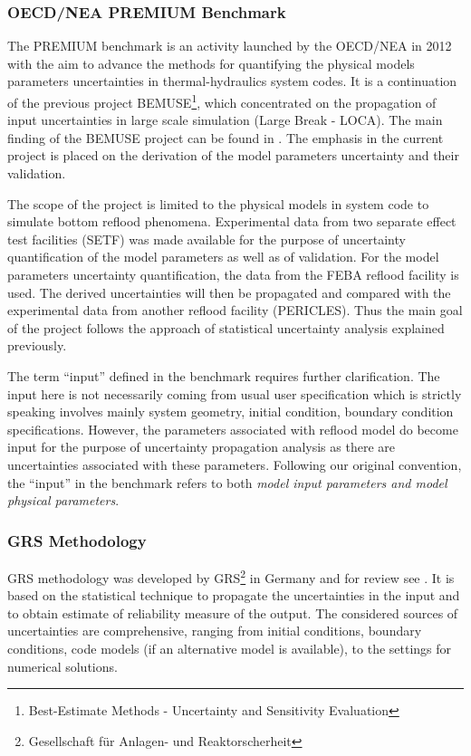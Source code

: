 \documentclass[11pt,titlepage]{article}
\begin{document}
\subsubsection{OECD/NEA PREMIUM Benchmark}

The PREMIUM benchmark is an activity launched by the OECD/NEA in 2012 with the aim to advance the methods for quantifying the physical models parameters uncertainties in thermal-hydraulics system codes.
It is a continuation of the previous project BEMUSE\footnote{Best-Estimate Methods - Uncertainty and Sensitivity Evaluation}, which concentrated on the propagation of input uncertainties in large scale simulation (Large Break - LOCA).
The main finding of the BEMUSE project can be found in \cite{Perezetal2011}.
The emphasis in the current project is placed on the derivation of the model parameters uncertainty and their validation.

The scope of the project is limited to the physical models in system code to simulate bottom reflood phenomena.
Experimental data from two separate effect test facilities (SETF) was made available for the purpose of uncertainty quantification of the model parameters as well as of validation.
For the model parameters uncertainty quantification, the data from the FEBA reflood facility \cite{IhleRust1984} is used.
The derived uncertainties will then be propagated and compared with the experimental data from another reflood facility (PERICLES).
Thus the main goal of the project follows the approach of statistical uncertainty analysis explained previously.

The term ``input'' defined in the benchmark requires further clarification. 
The input here is not necessarily coming from usual user specification which is strictly speaking involves mainly system geometry, initial condition, boundary condition specifications. 
However, the parameters associated with reflood model do become input for the purpose of uncertainty propagation analysis as there are uncertainties associated with these parameters. 
Following our original convention, the ``input'' in the benchmark refers to both \emph{model input parameters and model physical parameters}.

\subsubsection{GRS Methodology}

GRS methodology was developed by GRS\footnote{Gesellschaft f\"ur Anlagen- und Reaktorscherheit} in Germany \cite{Glaeser1994} and for review see \cite{Glaeser2008}. 
It is based on the statistical technique to propagate the uncertainties in the input and to obtain estimate of reliability measure of the output. 
The considered sources of uncertainties are comprehensive, ranging from initial conditions, boundary conditions, code models (if an alternative model is available), to the settings for numerical solutions.
\end{document}
